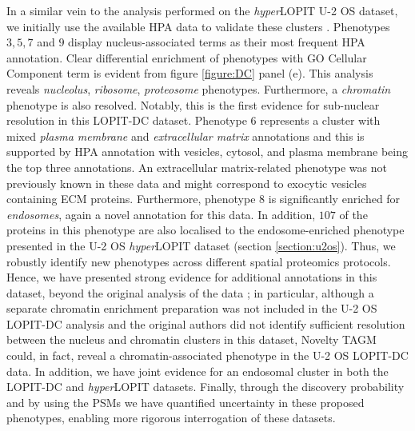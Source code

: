 \documentclass[12pt,english]{article}
\begin{document}
In a similar vein to the analysis performed on the \textit{hyper}LOPIT U-2 OS dataset, we initially use the available HPA data to validate these clusters \citep{Thul:2017}. Phenotypes $3,5,7$ and $9$ display nucleus-associated terms as their most frequent HPA annotation. Clear differential enrichment of phenotypes with GO Cellular Component term is evident from figure \ref{figure:DC} panel (e). This analysis reveals \textit{nucleolus}, \textit{ribosome}, \textit{proteosome} phenotypes. Furthermore, a \textit{chromatin} phenotype is also resolved. Notably, this is the first evidence for sub-nuclear resolution in this LOPIT-DC dataset. Phenotype $6$ represents a cluster with mixed \textit{plasma membrane} and \textit{extracellular matrix} annotations and this is supported by HPA annotation with vesicles, cytosol, and plasma membrane being the top three annotations. An extracellular matrix-related phenotype was not previously known in these data and might correspond to exocytic vesicles containing ECM proteins. Furthermore, phenotype $8$ is significantly enriched for \textit{endosomes}, again a novel annotation for this data. In addition, $107$ of the proteins in this phenotype are also localised to the endosome-enriched phenotype presented in the U-2 OS \textit{hyper}LOPIT dataset (section \ref{section:u2os}). Thus, we robustly identify new phenotypes across different spatial proteomics protocols. Hence, we have presented strong evidence for additional annotations in this dataset, beyond the original analysis of the data \citep{DC:2018}; in particular, although a separate chromatin enrichment preparation was not included in the U-2 OS LOPIT-DC analysis and the original authors did not identify sufficient resolution between the nucleus and chromatin clusters in this dataset, Novelty TAGM could, in fact, reveal a chromatin-associated phenotype in the U-2 OS LOPIT-DC data. In addition, we have joint evidence for an endosomal cluster in both the LOPIT-DC and \textit{hyper}LOPIT datasets. Finally, through the discovery probability and by using the PSMs we have quantified uncertainty in these proposed phenotypes, enabling more rigorous interrogation of these datasets.


 
\end{document}
